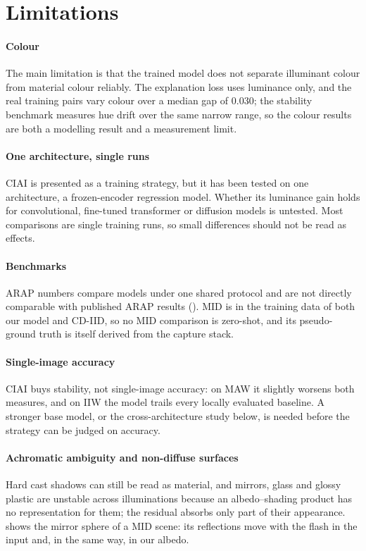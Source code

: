 \section{Limitations}

\paragraph{Colour}
The main limitation is that the trained model does not separate illuminant colour from
material colour reliably. The explanation loss uses luminance only, and the real training
pairs vary colour over a median gap of $0.030$; the stability benchmark measures hue drift
over the same narrow range, so the colour results are both a modelling result and a
measurement limit.

\paragraph{One architecture, single runs}
CIAI is presented as a training strategy, but it has been tested on one architecture, a
frozen-encoder regression model. Whether its luminance gain holds for convolutional,
fine-tuned transformer or diffusion models is untested. Most comparisons are single
training runs, so small differences should not be read as effects.

\paragraph{Benchmarks}
ARAP numbers compare models under one shared protocol and are not directly comparable with
published ARAP results (). MID is in the training data of
both our model and CD-IID, so no MID comparison is zero-shot, and its pseudo-ground truth
is itself derived from the capture stack.

\paragraph{Single-image accuracy}
CIAI buys stability, not single-image accuracy: on MAW it slightly worsens both measures,
and on IIW the model trails every locally evaluated baseline. A stronger base model, or the cross-architecture
study below, is needed before the strategy can be judged on accuracy.

\paragraph{Achromatic ambiguity and non-diffuse surfaces}
Hard cast shadows can still be read as material, and mirrors, glass and glossy plastic are
unstable across illuminations because an albedo--shading product has no representation for
them; the residual absorbs only part of their appearance.  shows
the mirror sphere of a MID scene: its reflections move with the flash in the input and, in the
same way, in our albedo.

